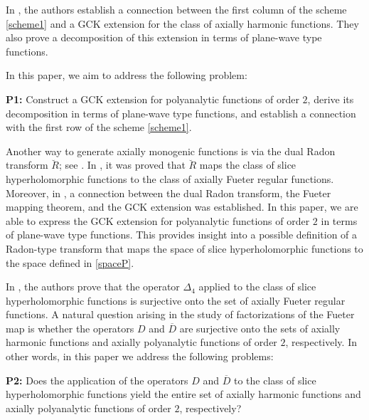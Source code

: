 \documentclass[reqno,11pt]{amsart}
\numberwithin{equation}{section}
\theoremstyle{definition}
\begin{document}
\newline
\newline
In \cite{DG}, the authors establish a connection between the first column of the scheme \eqref{scheme1} and a GCK extension for the class of axially harmonic functions. They also prove a decomposition of this extension in terms of plane-wave type functions.

\medskip

In this paper, we aim to address the following problem:

\medskip

\textbf{P1:} Construct a GCK extension for polyanalytic functions of order $2$, derive its decomposition in terms of plane-wave type functions, and establish a connection with the first row of the scheme \eqref{scheme1}.

\medskip

Another way to generate axially monogenic functions is via the dual Radon transform $\breve{R}$; see \cite{HOCH}. In \cite{CLSSmathAn}, it was proved that $\breve{R}$ maps the class of slice hyperholomorphic functions to the class of axially Fueter regular functions. Moreover, in \cite{DDG}, a connection between the dual Radon transform, the Fueter mapping theorem, and the GCK extension was established.
In this paper, we are able to express the GCK extension for polyanalytic functions of order $2$ in terms of plane-wave type functions. This provides insight into a possible definition of a Radon-type transform that maps the space of slice hyperholomorphic functions to the space defined in \eqref{spaceP}.

\medskip


In \cite{CSSOinverse, CSSinve}, the authors prove that the operator $\Delta_4$ applied to the class of slice hyperholomorphic functions is surjective onto the set of axially Fueter regular functions. A natural question arising in the study of factorizations of the Fueter map is whether the operators $D$ and $\overline{D}$ are surjective onto the sets of axially harmonic functions and axially polyanalytic functions of order $2$, respectively. In other words, in this paper we address the following problems:

\medskip

\textbf{P2:} Does the application of the operators $D$ and $\overline{D}$ to the class of slice hyperholomorphic functions yield the entire set of axially harmonic functions and axially polyanalytic functions of order $2$, respectively?

\medskip
\end{document}
